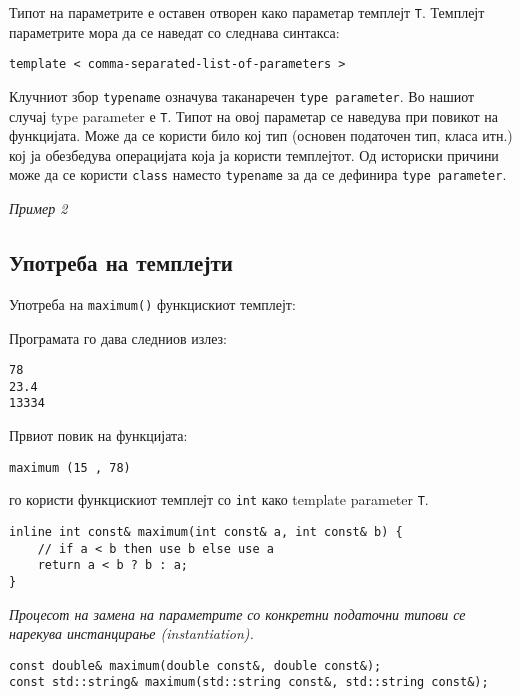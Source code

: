 

Типот на параметрите е оставен отворен како параметар темплејт \texttt{T}.
Темплејт параметрите мора да се наведат со следнава синтакса:

\begin{lstlisting}
template < comma-separated-list-of-parameters >
\end{lstlisting}

Клучниот збор \texttt{typename} означува таканаречен \texttt{type parameter}. Во
нашиот случај type parameter е \texttt{T}. Типот на овој параметар се наведува при повикот на
функцијата. Може да се користи било кој тип (основен податочен тип, класа итн.)
кој ја обезбедува операцијата која ја користи темплејтот. Од историски причини
може да се користи \texttt{class} наместо \texttt{typename} за да се дефинира
\texttt{type parameter}.

\textsl{Пример 2}



\subsection{Употреба на темплејти}

Употреба на \texttt{maximum()} функцискиот темплејт:



Програмата го дава следниов излез:

\begin{verbatim}
78
23.4
13334
\end{verbatim}

Првиот повик на функцијата:

\begin{lstlisting}
maximum (15 , 78)
\end{lstlisting}

го користи функцискиот темплејт со \texttt{int} како template parameter \texttt{T}.
\begin{lstlisting}
inline int const& maximum(int const& a, int const& b) {
	// if a < b then use b else use a
	return a < b ? b : a;
}
\end{lstlisting}

\emph{Процесот на замена на параметрите со конкретни податочни типови се нарекува
инстанцирање (instantiation).}

\begin{lstlisting}
const double& maximum(double const&, double const&);
const std::string& maximum(std::string const&, std::string const&);
\end{lstlisting}

